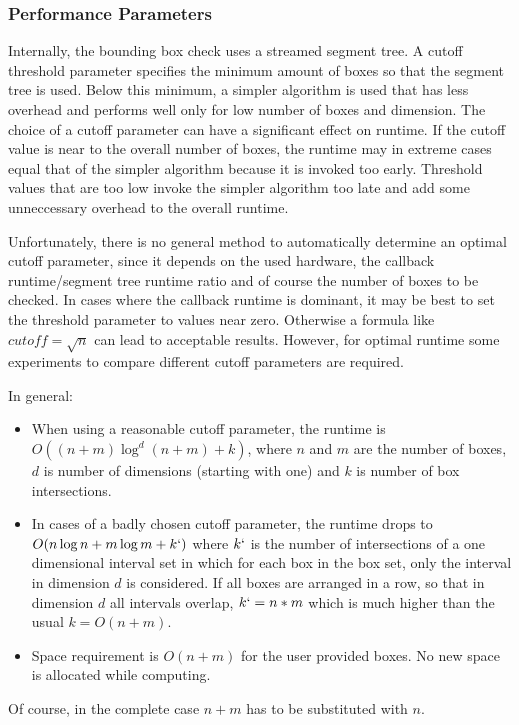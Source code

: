 \subsubsection*{Performance Parameters}
Internally, the bounding box check uses a streamed segment tree. A cutoff threshold parameter specifies the minimum amount of boxes so that the segment tree is used. Below this minimum, a simpler algorithm is used that has less overhead and performs well only for low number of boxes and dimension. The choice of a cutoff parameter can have a significant effect on runtime. If the cutoff value is near to the overall number of boxes, the runtime may in extreme cases equal that of the simpler algorithm because it is invoked too early. Threshold values that are too low invoke the simpler algorithm too late and add some unneccessary overhead to the overall runtime.

Unfortunately, there is no general method to automatically determine an optimal cutoff parameter, since it depends on the used hardware, the callback runtime/segment tree runtime ratio and of course the number of boxes to be checked. In cases where the callback runtime is dominant, it may be best to set the threshold parameter to values near zero. Otherwise a formula like $cutoff=\sqrt{n}$ can lead to acceptable results. However, for optimal runtime some experiments to compare different cutoff parameters are required.

In general:
\begin{itemize}
  \item When using a reasonable cutoff parameter, the runtime is $O((n+m)\log^{d}(n+m)+k)$, where $n$ and $m$ are the number of boxes, $d$ is number of dimensions (starting with one) and $k$ is number of box intersections.
  \item In cases of a badly chosen cutoff parameter, the runtime drops to $O(n\log n+m\log m+k`)$ where $k`$ is the number of intersections of a one dimensional interval set in which for each box in the box set, only the interval in dimension $d$ is considered. If all boxes are arranged in a row, so that in dimension $d$ all intervals overlap, $k`=n*m$ which is much higher than the usual $k=O(n+m)$.
  \item Space requirement is $O(n+m)$ for the user provided boxes. No new space is allocated while computing.
\end{itemize}

Of course, in the complete case $n+m$ has to be substituted with $n$.


